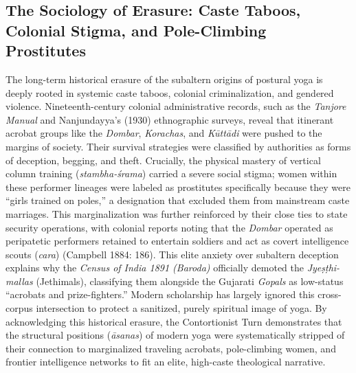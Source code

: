 \documentclass[11pt,letterpaper]{article}
\begin{document}
\subsection{The Sociology of Erasure: Caste Taboos, Colonial Stigma, and Pole-Climbing Prostitutes}
The long-term historical erasure of the subaltern origins of postural yoga is deeply rooted in systemic caste taboos, colonial criminalization, and gendered violence. Nineteenth-century colonial administrative records, such as the \textit{Tanjore Manual} and Nanjundayya’s (1930) ethnographic surveys, reveal that itinerant acrobat groups like the \textit{Dombar}, \textit{Korachas}, and \textit{Kūttādi} were pushed to the margins of society. Their survival strategies were classified by authorities as forms of deception, begging, and theft. Crucially, the physical mastery of vertical column training (\textit{stambha-śrama}) carried a severe social stigma; women within these performer lineages were labeled as prostitutes specifically because they were ``girls trained on poles,'' a designation that excluded them from mainstream caste marriages. This marginalization was further reinforced by their close ties to state security operations, with colonial reports noting that the \textit{Dombar} operated as peripatetic performers retained to entertain soldiers and act as covert intelligence scouts (\textit{cara}) (Campbell 1884: 186). This elite anxiety over subaltern deception explains why the \textit{Census of India 1891 (Baroda)} officially demoted the \textit{Jyeṣṭhi-mallas} (Jethimals), classifying them alongside the Gujarati \textit{Gopals} as low-status ``acrobats and prize-fighters.'' Modern scholarship has largely ignored this cross-corpus intersection to protect a sanitized, purely spiritual image of yoga. By acknowledging this historical erasure, the Contortionist Turn demonstrates that the structural positions (\textit{āsanas}) of modern yoga were systematically stripped of their connection to marginalized traveling acrobats, pole-climbing women, and frontier intelligence networks to fit an elite, high-caste theological narrative.
	
\end{document}
